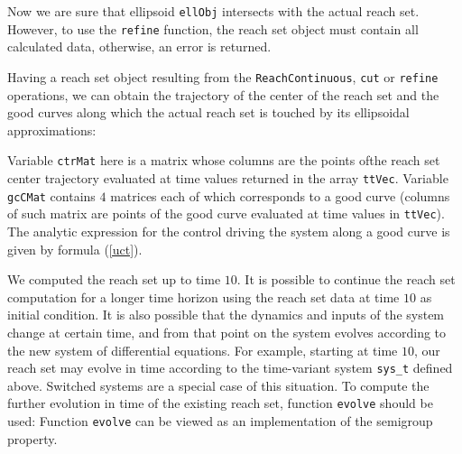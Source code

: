Now we are sure that ellipsoid {\tt ellObj} intersects with the actual reach set.
However, to use the {\tt refine} function,
the reach set object must contain all calculated data, otherwise, an
error is returned.

Having a reach set object resulting from the {\tt ReachContinuous}, {\tt cut} or
{\tt refine} operations, we can obtain the trajectory of the center
of the reach set and the good curves along which the actual reach set
is touched by its ellipsoidal approximations:

Variable {\tt ctrMat} here is a matrix whose columns are the points ofthe
reach set center trajectory evaluated at time values returned in the
array {\tt ttVec}. Variable {\tt gcCMat} contains $4$ matrices each of which
corresponds to a good curve (columns of such matrix are points of the
good curve evaluated at time values in {\tt ttVec}).
The analytic expression for the control driving the system along a good
curve is given by formula (\ref{uct}).

We computed the reach set up to time $10$. It is possible to continue
the reach set computation for a longer time horizon using the reach set
data at time $10$ as initial condition.
It is also possible that the dynamics and inputs of the system change at
certain time, and from that point on the system evolves according to the new
system of differential equations. For example, starting at time $10$, our
reach set may evolve in time according to the time-variant system {\tt sys\_t}
defined above. Switched systems are a special case of this situation.
To compute the further evolution in time of the existing reach set,
function {\tt evolve} should be used:
Function {\tt evolve} can be viewed as an implementation of the semigroup
property.

